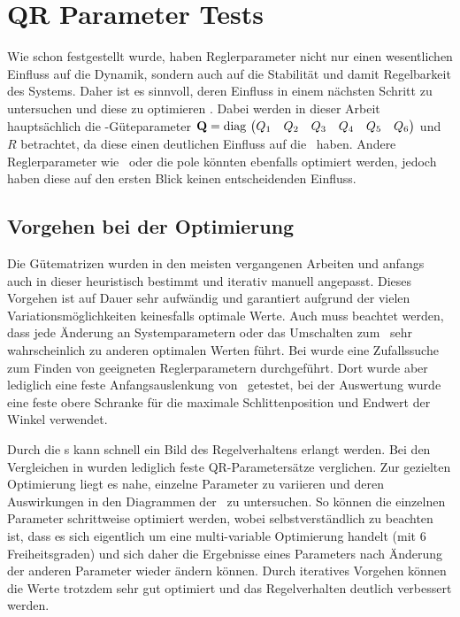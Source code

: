 \section{QR Parameter Tests}\label{sec:x0qr}

Wie schon festgestellt wurde, haben Reglerparameter nicht nur einen wesentlichen Einfluss auf die Dynamik, sondern auch auf die Stabilität und damit Regelbarkeit des Systems.
Daher ist es sinnvoll, deren Einfluss in einem nächsten Schritt zu untersuchen und diese zu optimieren .
Dabei werden in dieser Arbeit hauptsächlich die \ricc-Güteparameter ${\boldsymbol{\mathrm{Q}}}=\mathrm{diag} \, \left(\begin{matrix} Q_1 & Q_2 & Q_3 & Q_4 & Q_5 & Q_6 \end{matrix}\right)$ und $R$ betrachtet, da diese einen deutlichen Einfluss auf die \aprg\ haben.
Andere Reglerparameter wie \kpv\ oder die \beob pole könnten ebenfalls optimiert werden, jedoch haben diese auf den ersten Blick keinen entscheidenden Einfluss.


\subsection{Vorgehen bei der Optimierung}

Die Gütematrizen wurden in den meisten vergangenen Arbeiten und anfangs auch in dieser heuristisch bestimmt und iterativ manuell angepasst.
Dieses Vorgehen ist auf Dauer sehr aufwändig und garantiert aufgrund der vielen Variationsmöglichkeiten keinesfalls optimale Werte.
Auch muss beachtet werden, dass jede Änderung an Systemparametern oder das Umschalten zum \beob\ sehr wahrscheinlich zu anderen optimalen Werten führt.
Bei \cite{chang} wurde eine Zufallssuche zum Finden von geeigneten Reglerparametern durchgeführt.
Dort wurde aber lediglich eine feste Anfangsauslenkung von \phz\ getestet, bei der Auswertung wurde eine feste obere Schranke für die maximale Schlittenposition und Endwert der Winkel verwendet.

Durch die \xots s  kann schnell ein Bild des Regelverhaltens erlangt werden.
Bei den Vergleichen in  wurden lediglich feste QR-Parametersätze verglichen.
Zur gezielten Optimierung liegt es nahe, einzelne Parameter zu variieren und deren Auswirkungen in den Diagrammen der \xots\ zu untersuchen.
So können die einzelnen Parameter schrittweise optimiert werden, wobei selbstverständlich zu beachten ist, dass es sich eigentlich um eine multi-variable Optimierung handelt (mit 6 Freiheitsgraden) und sich daher die Ergebnisse eines Parameters nach Änderung der anderen Parameter wieder ändern können.
Durch iteratives Vorgehen können die Werte trotzdem sehr gut optimiert und das Regelverhalten deutlich verbessert werden.



